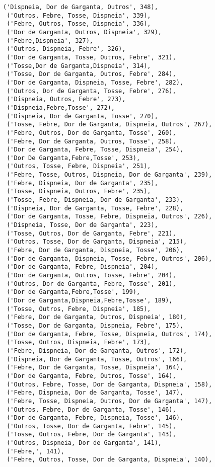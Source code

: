 \documentclass[11pt]{article}
\begin{document}
\begin{tcolorbox}[breakable, size=fbox, boxrule=.5pt, pad at break*=1mm, opacityfill=0]
\begin{Verbatim}[commandchars=\\\{\}]
 ('Dispneia, Dor de Garganta, Outros', 348),
 ('Outros, Febre, Tosse, Dispneia', 339),
 ('Febre, Outros, Tosse, Dispneia', 336),
 ('Dor de Garganta, Outros, Dispneia', 329),
 ('Febre,Dispneia', 327),
 ('Outros, Dispneia, Febre', 326),
 ('Dor de Garganta, Tosse, Outros, Febre', 321),
 ('Tosse,Dor de Garganta,Dispneia', 314),
 ('Tosse, Dor de Garganta, Outros, Febre', 284),
 ('Dor de Garganta, Dispneia, Tosse, Febre', 282),
 ('Outros, Dor de Garganta, Tosse, Febre', 276),
 ('Dispneia, Outros, Febre', 273),
 ('Dispneia,Febre,Tosse', 272),
 ('Dispneia, Dor de Garganta, Tosse', 270),
 ('Tosse, Febre, Dor de Garganta, Dispneia, Outros', 267),
 ('Febre, Outros, Dor de Garganta, Tosse', 260),
 ('Febre, Dor de Garganta, Outros, Tosse', 258),
 ('Dor de Garganta, Febre, Tosse, Dispneia', 254),
 ('Dor De Garganta,Febre,Tosse', 253),
 ('Outros, Tosse, Febre, Dispneia', 251),
 ('Febre, Tosse, Outros, Dispneia, Dor de Garganta', 239),
 ('Febre, Dispneia, Dor de Garganta', 235),
 ('Tosse, Dispneia, Outros, Febre', 235),
 ('Tosse, Febre, Dispneia, Dor de Garganta', 233),
 ('Dispneia, Dor de Garganta, Tosse, Febre', 228),
 ('Dor de Garganta, Tosse, Febre, Dispneia, Outros', 226),
 ('Dispneia, Tosse, Dor de Garganta', 223),
 ('Tosse, Outros, Dor de Garganta, Febre', 221),
 ('Outros, Tosse, Dor de Garganta, Dispneia', 215),
 ('Febre, Dor de Garganta, Dispneia, Tosse', 206),
 ('Dor de Garganta, Dispneia, Tosse, Febre, Outros', 206),
 ('Dor de Garganta, Febre, Dispneia', 204),
 ('Dor de Garganta, Outros, Tosse, Febre', 204),
 ('Outros, Dor de Garganta, Febre, Tosse', 201),
 ('Dor de Garganta,Febre,Tosse', 199),
 ('Dor de Garganta,Dispneia,Febre,Tosse', 189),
 ('Tosse, Outros, Febre, Dispneia', 185),
 ('Febre, Dor de Garganta, Outros, Dispneia', 180),
 ('Tosse, Dor de Garganta, Dispneia, Febre', 175),
 ('Dor de Garganta, Febre, Tosse, Dispneia, Outros', 174),
 ('Tosse, Outros, Dispneia, Febre', 173),
 ('Febre, Dispneia, Dor de Garganta, Outros', 172),
 ('Dispneia, Dor de Garganta, Tosse, Outros', 166),
 ('Febre, Dor de Garganta, Tosse, Dispneia', 164),
 ('Dor de Garganta, Febre, Outros, Tosse', 164),
 ('Outros, Febre, Tosse, Dor de Garganta, Dispneia', 158),
 ('Febre, Dispneia, Dor de Garganta, Tosse', 147),
 ('Febre, Tosse, Dispneia, Outros, Dor de Garganta', 147),
 ('Outros, Febre, Dor de Garganta, Tosse', 146),
 ('Dor de Garganta, Febre, Dispneia, Tosse', 146),
 ('Outros, Tosse, Dor de Garganta, Febre', 145),
 ('Tosse, Outros, Febre, Dor de Garganta', 143),
 ('Outros, Dispneia, Dor de Garganta', 141),
 ('Febre,', 141),
 ('Febre, Outros, Tosse, Dor de Garganta, Dispneia', 140),

\end{Verbatim}
\end{tcolorbox}
\end{document}
